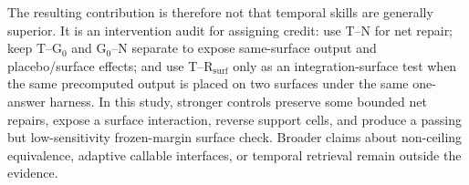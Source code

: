 The resulting contribution is therefore not that temporal skills are generally superior. It is an intervention audit for assigning credit: use T--N for net repair; keep T--G$_0$ and G$_0$--N separate to expose same-surface output and placebo/surface effects; and use T--R$_{\mathrm{surf}}$ only as an integration-surface test when the same precomputed output is placed on two surfaces under the same one-answer harness. In this study, stronger controls preserve some bounded net repairs, expose a surface interaction, reverse support cells, and produce a passing but low-sensitivity frozen-margin surface check. Broader claims about non-ceiling equivalence, adaptive callable interfaces, or temporal retrieval remain outside the evidence.
